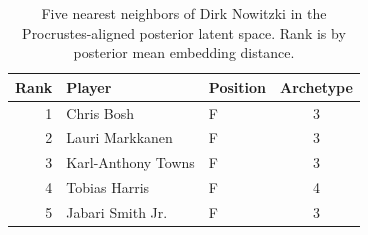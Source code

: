 \begin{table}[htbp]
  \centering\small
  \begin{tabular}{rllc}
    \toprule
    Rank & Player & Position & Archetype \\
    \midrule
    1 & Chris Bosh & F & 3 \\
    2 & Lauri Markkanen & F & 3 \\
    3 & Karl-Anthony Towns & F & 3 \\
    4 & Tobias Harris & F & 4 \\
    5 & Jabari Smith Jr. & F & 3 \\
    \bottomrule
  \end{tabular}
  \caption{Five nearest neighbors of Dirk Nowitzki in the Procrustes-aligned posterior latent space. Rank is by posterior mean embedding distance.}
  \label{tab:Dirk_Nowitzki_neighbors}
\end{table}

